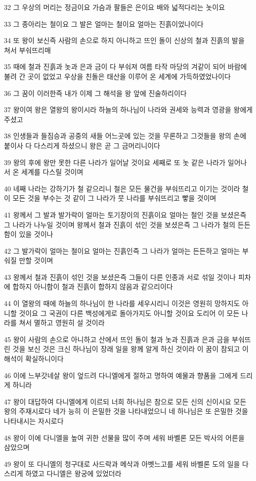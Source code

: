\par 32 그 우상의 머리는 정금이요 가슴과 팔들은 은이요 배와 넓적다리는 놋이요
\par 33 그 종아리는 철이요 그 발은 얼마는 철이요 얼마는 진흙이었나이다
\par 34 또 왕이 보신즉 사람의 손으로 하지 아니하고 뜨인 돌이 신상의 철과 진흙의 발을 쳐서 부숴뜨리매
\par 35 때에 철과 진흙과 놋과 은과 금이 다 부숴져 여름 타작 마당의 겨같이 되어 바람에 불려 간 곳이 없었고 우상을 친돌은 태산을 이루어 온 세계에 가득하였었나이다
\par 36 그 꿈이 이러한즉 내가 이제 그 해석을 왕 앞에 진술하리이다
\par 37 왕이여 왕은 열왕의 왕이시라 하늘의 하나님이 나라와 권세와 능력과 영광을 왕에게 주셨고
\par 38 인생들과 들짐승과 공중의 새들 어느곳에 있는 것을 무론하고 그것들을 왕의 손에 붙이사 다 다스리게 하셨으니 왕은 곧 그 금머리니이다
\par 39 왕의 후에 왕만 못한 다른 나라가 일어날 것이요 세째로 또 놋 같은 나라가 일어나서 온 세계를 다스릴 것이며
\par 40 네째 나라는 강하기가 철 같으리니 철은 모든 물건을 부숴뜨리고 이기는 것이라 철이 모든 것을 부수는 것 같이 그 나라가 뭇 나라를 부숴뜨리고 빻을 것이며
\par 41 왕께서 그 발과 발가락이 얼마는 토기장이의 진흙이요 얼마는 철인 것을 보셨은즉 그 나라가 나누일 것이며 왕께서 철과 진흙이 섞인 것을 보셨은즉 그 나라가 철의 든든함이 있을 것이나
\par 42 그 발가락이 얼마는 철이요 얼마는 진흙인즉 그 나라가 얼마는 든든하고 얼마는 부숴질 만할 것이며
\par 43 왕께서 철과 진흙이 섞인 것을 보셨은즉 그들이 다른 인종과 서로 섞일 것이나 피차에 합하지 아니함이 철과 진흙이 합하지 않음과 같으리이다
\par 44 이 열왕의 때에 하늘의 하나님이 한 나라를 세우시리니 이것은 영원히 망하지도 아니할 것이요 그 국권이 다른 백성에게로 돌아가지도 아니할 것이요 도리어 이 모든 나라를 쳐서 멸하고 영원히 설 것이라
\par 45 왕이 사람의 손으로 아니하고 산에서 뜨인 돌이 철과 놋과 진흙과 은과 금을 부숴뜨린 것을 보신 것은 크신 하나님이 장래 일을 왕께 알게 하신 것이라 이 꿈이 참되고 이 해석이 확실하니이다
\par 46 이에 느부갓네살 왕이 엎드려 다니엘에게 절하고 명하여 예물과 향품을 그에게 드리게 하니라
\par 47 왕이 대답하여 다니엘에게 이르되 너희 하나님은 참으로 모든 신의 신이시요 모든 왕의 주재시로다 네가 능히 이 은밀한 것을 나타내었으니 네 하나님은 또 은밀한 것을 나타내시는 자시로다
\par 48 왕이 이에 다니엘을 높여 귀한 선물을 많이 주며 세워 바벨론 모든 박사의 어른을 삼았으며
\par 49 왕이 또 다니엘의 청구대로 사드락과 메삭과 아벳느고를 세워 바벨론 도의 일을 다스리게 하였고 다니엘은 왕궁에 있었더라

